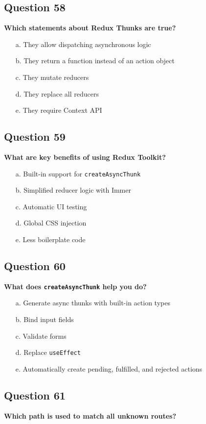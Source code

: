 \documentclass{article}
\begin{document}
\subsection*{Question 58}
\textbf{Which statements about Redux Thunks are true?}

\begin{itemize}
  \item[a.] They allow dispatching asynchronous logic
  \item[b.] They return a function instead of an action object
  \item[c.] They mutate reducers
  \item[d.] They replace all reducers
  \item[e.] They require Context API
\end{itemize}

\subsection*{Question 59}
\textbf{What are key benefits of using Redux Toolkit?}

\begin{itemize}
  \item[a.] Built-in support for \texttt{createAsyncThunk}
  \item[b.] Simplified reducer logic with Immer
  \item[c.] Automatic UI testing
  \item[d.] Global CSS injection
  \item[e.] Less boilerplate code
\end{itemize}

\subsection*{Question 60}
\textbf{What does \texttt{createAsyncThunk} help you do?}

\begin{itemize}
  \item[a.] Generate async thunks with built-in action types
  \item[b.] Bind input fields
  \item[c.] Validate forms
  \item[d.] Replace \texttt{useEffect}
  \item[e.] Automatically create pending, fulfilled, and rejected actions
\end{itemize}

\subsection*{Question 61}
\textbf{Which path is used to match all unknown routes?}
\end{document}
